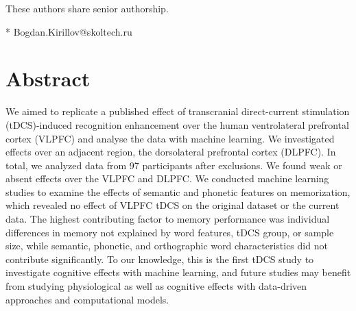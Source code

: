 \documentclass[10pt,letterpaper]{article}
\begin{document}
\begin{flushleft}
\ddag These authors share senior authorship.




* Bogdan.Kirillov@skoltech.ru

\end{flushleft}


\section*{Abstract}
We aimed to replicate a published effect of transcranial direct-current stimulation (tDCS)-induced recognition enhancement over the human ventrolateral prefrontal cortex (VLPFC) and analyse the data with machine learning. We investigated effects over an adjacent region, the dorsolateral prefrontal cortex (DLPFC). In total, we analyzed data from 97 participants after exclusions.  We found weak or absent effects over the VLPFC and DLPFC. We conducted machine learning studies to examine the effects of semantic and phonetic features on memorization, which revealed no effect of VLPFC tDCS on the original dataset or the current data. The highest contributing factor to memory performance was individual differences in memory not explained by word features, tDCS group, or sample size, while semantic, phonetic, and orthographic word characteristics did not contribute significantly. To our knowledge, this is the first tDCS study to investigate cognitive effects with machine learning, and future studies may benefit from studying physiological as well as cognitive effects with data-driven approaches and computational models.
\end{document}
